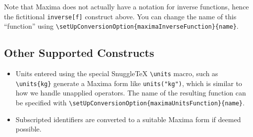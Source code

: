 Note that Maxima does not actually have a notation for inverse functions, hence
the fictitional \verb|inverse[f]| construct above. You can change the name of
this ``function'' using
\verb|\setUpConversionOption{maximaInverseFunction}{name}|.

\subsection*{Other Supported Constructs}

\begin{itemize}
\item
  Units entered using the special SnuggleTeX \verb|\units| macro, such as
  \verb|\units{kg}| generate a Maxima form like \verb|units("kg")|, which
  is similar to how we handle unapplied operators. The name of the
  resulting function can be specified with
  \verb|\setUpConversionOption{maximaUnitsFunction}{name}|.

\item
  Subscripted identifiers are converted to a suitable Maxima form if
  deemed possible.


\end{itemize}

